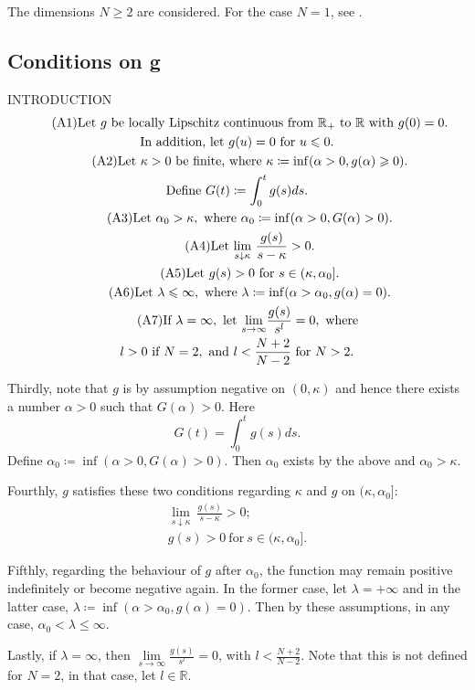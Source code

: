 The dimensions $N\geq2$ are considered. For the case $N=1$, see \cite{}. 

\subsection{Conditions on g}\label{con}\hfill

{\color{red}INTRODUCTION}
\begin{gather}\tag{A1}\label{a1}\text{Let }g\text{ be locally Lipschitz continuous from }\mathbb{R}_+\text{ to }\mathbb{R}\text{ with }g(0)=0.\\
\notag\text{In addition, let }g(u)=0\text{ for }u\leq0.\\
%
\tag{A2}\label{a2}\text{Let }\kappa>0\text{ be finite, where }\kappa\coloneqq\inf(\alpha>0,g(\alpha)\geq0).\\ 
%
\notag\text{Define }G(t)\coloneqq\int_0^t g(s)ds.\\
%
\tag{A3}\label{a3}\text{Let }\alpha_0>\kappa,\text{ where }\alpha_0\coloneqq\inf(\alpha>0,G(\alpha)>0).\\
%
\tag{A4}\label{a4}\text{Let }\underset{s\downarrow\kappa}{\lim}~\frac{g(s)}{s-\kappa}>0.\\
%
\tag{A5}\label{a5}\text{Let }g(s)>0\text{ for }s\in(\kappa,\alpha_0].\\
%
\tag{A6}\label{a6}\text{Let }\lambda\leq\infty,\text{ where }\lambda\coloneqq\inf(\alpha>\alpha_0,g(\alpha)=0).\\
%
\tag{A7}\label{a7}\text{If }\lambda=\infty,\text{ let }\underset{s\to\infty}{\lim}\frac{g(s)}{s^l}=0,\text{ where }\\ \notag l>0\text{ if }N=2,\text{ and }l<\frac{N+2}{N-2}\text{ for }N>2.
\end{gather}
{\color{gray}
Thirdly, note that $g$ is by assumption negative on $(0,\kappa)$ and hence there exists a number $\alpha>0$ such that $G(\alpha)>0$. Here $$G(t)=\int_0^t g(s)ds.$$ Define $\alpha_0\coloneqq\inf(\alpha>0,G(\alpha)>0)$. Then $\alpha_0$ exists by the above and $\alpha_0>\kappa$. 

Fourthly, $g$ satisfies these two conditions regarding $\kappa$ and $g$ on $(\kappa,\alpha_0]$:
\begin{gather}
\label{6}\underset{s\downarrow\kappa}{\lim}~\frac{g(s)}{s-\kappa}>0;\\
g(s)>0~\text{for}~s\in(\kappa,\alpha_0].
\end{gather}

Fifthly, regarding the behaviour of $g$ after $\alpha_0$, the function may remain positive indefinitely or become negative again. In the former case, let $\lambda=+\infty$ and in the latter case, $\lambda\coloneqq\inf(\alpha>\alpha_0,g(\alpha)=0)$. Then by these assumptions, in any case, $\alpha_0<\lambda\leq\infty$. 

Lastly, if $\lambda=\infty$, then $\underset{s\to\infty}{\lim}\frac{g(s)}{s^l}=0$, with $l<\frac{N+2}{N-2}$. Note that this is not defined for $N=2$, in that case, let $l\in\mathbb{R}$.}

